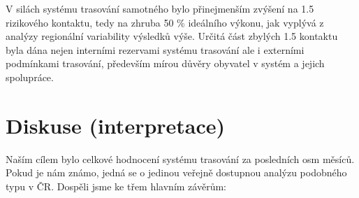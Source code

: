 V silách systému trasování samotného bylo přinejmenším zvýšení na 1.5 rizikového kontaktu, tedy na zhruba 50 \% ideálního výkonu, jak vyplývá z analýzy regionální variability výsledků výše. Určitá část zbylých 1.5 kontaktu byla dána nejen interními rezervami systému trasování ale i externími podmínkami trasování, především mírou důvěry obyvatel v systém a jejich spolupráce.

\section*{Diskuse (interpretace)}

Naším cílem bylo celkové hodnocení systému trasování za posledních osm měsíců. Pokud je nám známo, jedná se o jedinou veřejně dostupnou analýzu podobného typu v ČR. Dospěli jsme ke třem hlavním závěrům:

